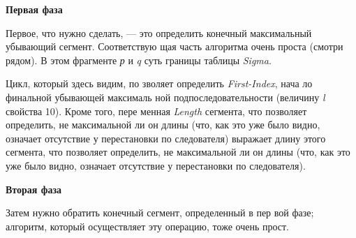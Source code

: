 \documentclass{../../template/mai_book}
\begin{document}
{\noindent \textbf{\large{Первая фаза}}

Первое, что нужно сделать, — это 
определить  конечный  максимальный 
убывающий  сегмент.  Соответствую­
щая  часть  алгоритма  очень  проста 
(смотри рядом). В этом фрагменте \textit{р} и \textit{q}
 суть границы таблицы \textit{Sigma}.
 
Цикл,  который  здесь  видим,  по­
зволяет определить \textit{First-Index}, нача­
ло финальной убывающей максималь­
ной  подпоследовательности  (величи­ну \textit{l}
  свойства  10).  Кроме того, пере­
менная \textit{Length}
сегмента,  что  позволяет  определить,  не  максимальной  ли  он  длины 
(что, как это уже было видно, означает отсутствие у перестановки по­
следователя)
 выражает длину этого сегмента,  что  позволяет  определить,  не  максимальной  ли  он  длины 
(что, как это уже было видно, означает отсутствие у перестановки по­
следователя).

\noindent \textbf{\large{Вторая фаза}}

Затем  нужно  обратить  конечный  сегмент,  определенный  в  пер­
вой фазе; алгоритм, который осуществляет эту операцию, тоже очень 
прост.

}
\end{document}
